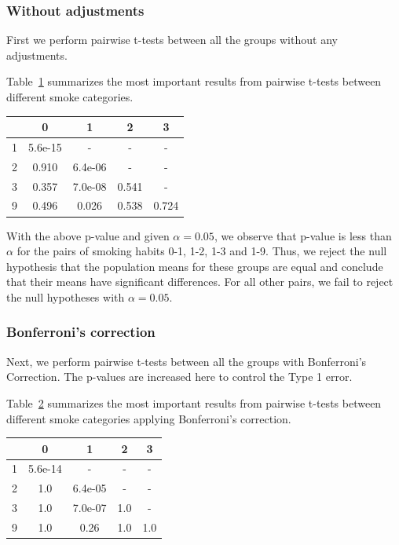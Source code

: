 \documentclass[fontsize=12 pt]{scrartcl}
\begin{document}
\subsubsection{Without adjustments}
First we perform pairwise t-tests between all the groups without any adjustments.

Table~\ref{tab:t_test} summarizes the most important results from pairwise t-tests between different smoke categories.

\begin{table}[ht]
\centering
{}
\label{tab:t_test}
\begin{tabular}{c|c|c|c|c}
 & 0  & 1 & 2 &3 \\
\hline
1 & 5.6e-15 & - & - & - \\
2 & 0.910 & 6.4e-06 & - & -  \\
3 & 0.357 & 7.0e-08 & 0.541 & - \\ 
9 & 0.496 & 0.026 & 0.538 & 0.724
\end{tabular}
\end{table}

With the above p-value and given $\alpha=0.05$, we observe that p-value is less than $\alpha$ for the pairs of smoking habits 0-1, 1-2, 1-3 and 1-9. Thus, we reject the null hypothesis that the population means for these groups are equal and conclude that their means have significant differences. For all other pairs, we fail to reject the null hypotheses with $\alpha=0.05$.

\subsubsection{Bonferroni's correction}
Next, we perform pairwise t-tests between all the groups with Bonferroni's Correction. The p-values are increased here to control the Type 1 error.

Table~\ref{tab:Bonferroni} summarizes the most important results from pairwise t-tests between different smoke categories applying Bonferroni's correction.

\begin{table}[ht]
\centering
{}
\label{tab:Bonferroni}
\begin{tabular}{c|c|c|c|c}
 & 0  & 1 & 2 &3 \\
\hline
1 & 5.6e-14 & - & - & - \\
2 & 1.0 & 6.4e-05 & - & -  \\
3 & 1.0 & 7.0e-07 & 1.0 & - \\ 
9 & 1.0 & 0.26 & 1.0 & 1.0
\end{tabular}
\end{table}
\end{document}
